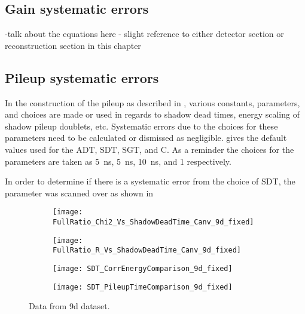 \subsection{Gain systematic errors}
\label{sub:gainerror}


-talk about the equations here - slight reference to either detector section or reconstruction section in this chapter



\subsection{Pileup systematic errors}
\label{sub:pileuperror}


In the construction of the pileup as described in , various constants, parameters, and choices are made or used in regards to shadow dead times, energy scaling of shadow pileup doublets, etc. Systematic errors due to the choices for these parameters need to be calculated or dismissed as negligible.  gives the default values used for the ADT, SDT, SGT, and C. As a reminder the choices for the parameters are taken as \SI{5}{ns}, \SI{5}{ns}, \SI{10}{ns}, and 1 respectively.


In order to determine if there is a systematic error from the choice of SDT, the parameter was scanned over as shown in \figref{}


\begin{figure}[]
\centering
    \begin{subfigure}[]{0.45\textwidth}
        \centering
        \texttt{[image: FullRatio\_Chi2\_Vs\_ShadowDeadTime\_Canv\_9d\_fixed]}
        \caption{}
    \end{subfigure}%
    \begin{subfigure}[]{0.45\textwidth}
        \centering
        \texttt{[image: FullRatio\_R\_Vs\_ShadowDeadTime\_Canv\_9d\_fixed]}
        \caption{}
    \end{subfigure}

    \begin{subfigure}[]{0.45\textwidth}
        \centering
        \texttt{[image: SDT\_CorrEnergyComparison\_9d\_fixed]}
        \caption{}
    \end{subfigure}%
    \begin{subfigure}[]{0.45\textwidth}
        \centering
        \texttt{[image: SDT\_PileupTimeComparison\_9d\_fixed]}
        \caption{}
    \end{subfigure}
\caption[]{Data from 9d dataset.}
\label{fig:}
\end{figure}


